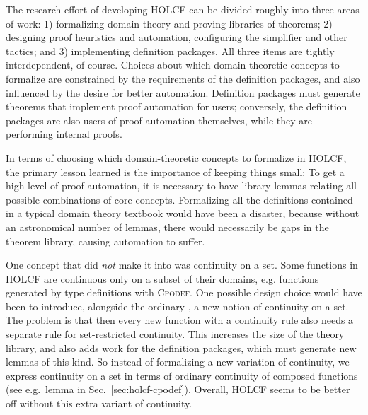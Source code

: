 The research effort of developing HOLCF can be divided roughly into three areas of work: 1) formalizing domain theory and proving libraries of theorems; 2) designing proof heuristics and automation, configuring the simplifier and other tactics; and 3) implementing definition packages.
%
All three items are tightly interdependent, of course. Choices about which domain-theoretic concepts to formalize are constrained by the requirements of the definition packages, and also influenced by the desire for better automation. Definition packages must generate theorems that implement proof automation for users; conversely, the definition packages are also users of proof automation themselves, while they are performing internal proofs.

In terms of choosing which domain-theoretic concepts to formalize in HOLCF, the primary lesson learned is the importance of keeping things small: To get a high level of proof automation, it is necessary to have library lemmas relating all possible combinations of core concepts. Formalizing all the definitions contained in a typical domain theory textbook would have been a disaster, because without an astronomical number of lemmas, there would necessarily be gaps in the theorem library, causing automation to suffer.

One concept that did \emph{not} make it into  was continuity on a set. Some functions in HOLCF are continuous only on a subset of their domains, e.g.  functions generated by type definitions with \textsc{Cpodef}. One possible design choice would have been to introduce, alongside the ordinary , a new notion of continuity on a set. The problem is that then every new function with a continuity rule also needs a separate rule for set-restricted continuity. This increases the size of the theory library, and also adds work for the definition packages, which must generate new lemmas of this kind. So instead of formalizing a new variation of continuity, we express continuity on a set in terms of ordinary continuity of composed functions (see e.g.\ lemma  in Sec.~\ref{sec:holcf-cpodef}). Overall, HOLCF seems to be better off without this extra variant of continuity.

